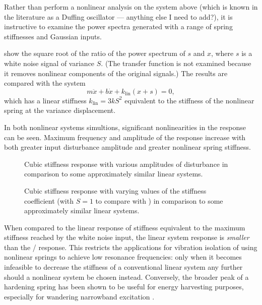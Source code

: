 Rather than perform a nonlinear analysis on the system above (which is known in the literature as a Duffing oscillator — anything else I need to add?), it is instructive to examine the power spectra generated with a range of spring stiffnesses and Gaussian inputs.

 show the square root of the ratio of the power spectrum of $s$ and $x$, where $s$ is a white noise signal of variance $S$.
(The transfer function is not examined because it removes nonlinear components of the original signals.)
The results are compared with the system
\begin{dmath}
m \ddot x + b \dot x + k_{\text{lin}}(x+s) = 0,
\end{dmath}
which has a linear stiffness $k_{\text{lin}}=3kS^2$ equivalent to the stiffness of the nonlinear spring at the variance displacement.

In both nonlinear systems simultions, significant nonlinearities in the response can be seen.
Maximum frequency and amplitude of the response increase with both greater input disturbance amplitude and greater nonlinear spring stiffness.

\begin{figure}
  \caption{Cubic stiffness response with various amplitudes of
    disturbance in comparison to some approximately similar linear
    systems.}
\end{figure}

\begin{figure}
  \caption{Cubic stiffness response with varying values of the
    stiffness coefficient (with $S=1$ to compare with
    ) in comparison to some
    approximately similar linear systems.}
\end{figure}

When compared to the linear response of stiffness equivalent to the maximum stiffness reached by the white noise input, the linear system response is \emph{smaller} than the \qzs/ response.
This restricts the applications for vibration isolation of using nonlinear springs to achieve low resonance frequencies: only when it becomes infeasible to decrease the stiffness of a conventional linear system any further should a nonlinear system be chosen instead.
Conversely, the broader peak of a hardening spring has been shown to be useful for energy harvesting purposes, especially for wandering narrowband excitation \cite{ramlan2009-nd}.



